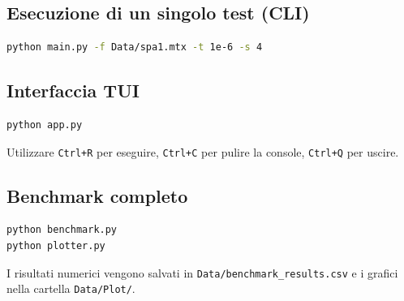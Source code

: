 \documentclass[a4paper,12pt]{article}
\begin{document}
\subsection{Esecuzione di un singolo test (CLI)}
\begin{lstlisting}[language=bash]
python main.py -f Data/spa1.mtx -t 1e-6 -s 4
\end{lstlisting}

\subsection{Interfaccia TUI}
\begin{lstlisting}[language=bash]
python app.py
\end{lstlisting}
Utilizzare \texttt{Ctrl+R} per eseguire, \texttt{Ctrl+C} per pulire la console, \texttt{Ctrl+Q} per uscire.

\subsection{Benchmark completo}
\begin{lstlisting}[language=bash]
python benchmark.py
python plotter.py
\end{lstlisting}
I risultati numerici vengono salvati in \texttt{Data/benchmark\_results.csv} e i grafici nella cartella \texttt{Data/Plot/}.
\end{document}
